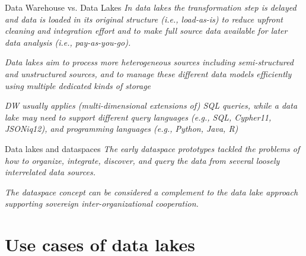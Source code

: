 \documentclass[xcolor=x11names,compress, 24pt]{beamer}
\renewcommand{\(}{\begin{columns}}
\renewcommand{\)}{\end{columns}}
\newcommand{\<}[1]{\begin{column}{#1}}
\renewcommand{\>}{\end{column}}
\begin{document}
\begin{frame}{Data Warehouse vs. Data Lakes}
	\emph{In data lakes the transformation step is delayed and data is loaded in its original structure (i.e., load-as-is) to reduce upfront cleaning and integration effort and to make full source data available for later data analysis (i.e., pay-as-you-go).} \vspace{.25cm}
	
	\emph{Data lakes aim to process more heterogeneous sources including semi-structured and unstructured sources, and to manage these different data models efficiently using multiple dedicated kinds of storage}\vspace{.25cm}
	
	\emph{DW usually applies (multi-dimensional extensions of) SQL queries, while a data lake may need to support different query languages (e.g., SQL, Cypher11, JSONiq12), and programming languages (e.g., Python, Java, R)}\vspace{.25cm}
\end{frame}


\begin{frame}{Data lakes and dataspaces}
	\emph{The early dataspace prototypes tackled the problems of how to organize, integrate, discover, and query the data from several loosely interrelated data sources. } \vspace{.25cm}
	
	\emph{ The dataspace concept can be considered a complement to the data lake approach supporting sovereign inter-organizational cooperation.}\vspace{.25cm}
\end{frame}
 \section{Use cases of data lakes}
 
\end{document}
